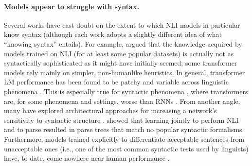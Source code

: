\documentclass[11pt,a4paper]{article}
\begin{document}
\paragraph{Models appear to struggle with syntax.} Several works have cast doubt on the extent to which NLI models in particular know syntax (although each work adopts a slightly different idea of what ``knowing syntax'' entails). For example,  argued that the knowledge acquired by models trained on NLI (for at least some popular datasets) is actually not as syntactically sophisticated as it might have initially seemed; some transformer models rely mainly on simpler, non-humanlike heuristics. In general, transformer LM performance has been found to be patchy and variable across linguistic phenomena \citep{dasgupta-etal-2018-evaluating, naik-etal-2018-stress, an-etal-2019-representation, ravichander-etal-2019-equate, jeretic-etal-2020-natural}. This is especially true for syntactic phenomena \citep{marvin-linzen-2018-targeted, hu-etal-2020-systematic, gauthier-etal-2020-syntaxgym, mccoy-etal-2020-berts, warstadt-etal-2020-blimp}, where transformers are, for some phenomena and settings, worse than RNNs \citep{van-schijndel-etal-2019-quantity}. From another angle, many have explored architectural approaches for increasing a network's sensitivity to syntactic structure \citep{chen-etal-2017-enhanced, Li-etal-2020-SANLI}.  showed that learning jointly to perform NLI  and to parse resulted in parse trees that match no popular syntactic formalisms. Furthermore, models trained explicitly to differentiate acceptable sentences from unacceptable ones (i.e., one of the most common syntactic tests used by linguists) have, to date, come nowhere near human performance \citep{warstadt-etal-2019-neural}.
\end{document}
